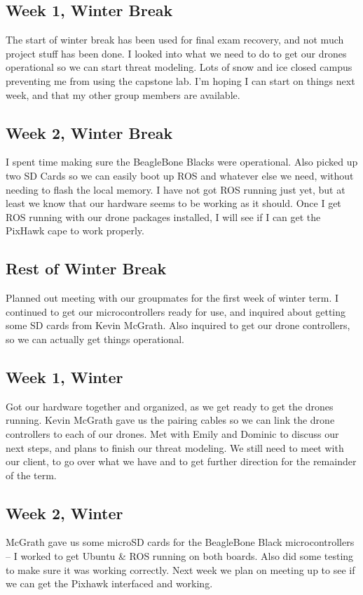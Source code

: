 \subsection{Week 1, Winter Break}
The start of winter break has been used for final exam recovery, and not much project stuff has been done. I looked into what we need to do to get our drones operational so we can start threat modeling. Lots of snow and ice closed campus preventing me from using the capstone lab. I'm hoping I can start on things next week, and that my other group members are available.
\subsection{Week 2, Winter Break}
I spent time making sure the BeagleBone Blacks were operational. Also picked up two SD Cards so we can easily boot up ROS and whatever else we need, without needing to flash the local memory. I have not got ROS running just yet, but at least we know that our hardware seems to be working as it should. Once I get ROS running with our drone packages installed, I will see if I can get the PixHawk cape to work properly.
\subsection{Rest of Winter Break}
Planned out meeting with our groupmates for the first week of winter term. I continued to get our microcontrollers ready for use, and inquired about getting some SD cards from Kevin McGrath. Also inquired to get our drone controllers, so we can actually get things operational.
\subsection{Week 1, Winter}
Got our hardware together and organized, as we get ready to get the drones running. Kevin McGrath gave us the pairing cables so we can link the drone controllers to each of our drones. Met with Emily and Dominic to discuss our next steps, and plans to finish our threat modeling. We still need to meet with our client, to go over what we have and to get further direction for the remainder of the term.
\subsection{Week 2, Winter}
McGrath gave us some microSD cards for the BeagleBone Black microcontrollers -- I worked to get Ubuntu & ROS running on both boards. Also did some testing to make sure it was working correctly. Next week we plan on meeting up to see if we can get the Pixhawk interfaced and working.
